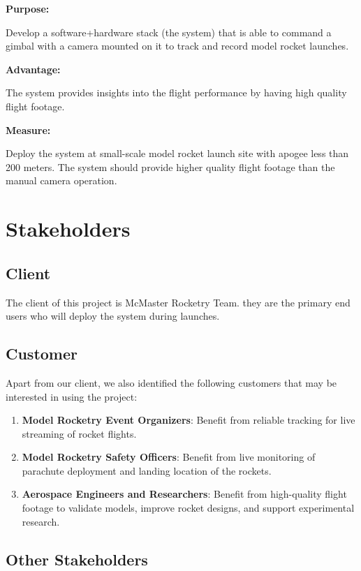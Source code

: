 \documentclass[12pt]{article}
\begin{document}
\textbf{Purpose:}

Develop a software+hardware stack (the system) that is able to command a gimbal
with a camera mounted on it to track and record model rocket launches.

\textbf{Advantage:}

The system provides insights into the flight performance by having high quality
flight footage.

\textbf{Measure:}

Deploy the system at small-scale model rocket launch site with apogee less than
200 meters. The system should provide higher quality flight footage than the
manual camera operation.

\section{Stakeholders}

\subsection{Client}

The client of this project is McMaster Rocketry Team. they are the primary end
users who will deploy the system during launches.

\subsection{Customer}

Apart from our client, we also identified the following customers that may be
interested in using the project:

\begin{enumerate}
  \item \textbf{Model Rocketry Event Organizers}: Benefit from
        reliable tracking for live streaming of rocket flights.
  \item \textbf{Model Rocketry Safety Officers}: Benefit from
        live monitoring of parachute deployment and landing location
        of the rockets.
  \item \textbf{Aerospace Engineers and Researchers}: Benefit from
        high-quality flight footage to validate models, improve rocket
        designs, and support experimental research.
\end{enumerate}

\subsection{Other Stakeholders}
\end{document}
